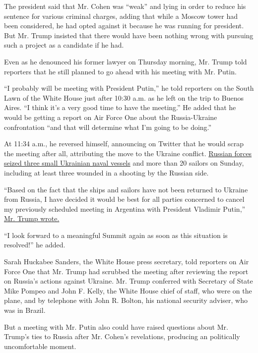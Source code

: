 The president said that Mr. Cohen was ``weak'' and lying in order to
reduce his sentence for various criminal charges, adding that while a
Moscow tower had been considered, he had opted against it because he was
running for president. But Mr. Trump insisted that there would have been
nothing wrong with pursuing such a project as a candidate if he had.

Even as he denounced his former lawyer on Thursday morning, Mr. Trump
told reporters that he still planned to go ahead with his meeting with
Mr. Putin.

``I probably will be meeting with President Putin,'' he told reporters
on the South Lawn of the White House just after 10:30 a.m. as he left on
the trip to Buenos Aires. ``I think it's a very good time to have the
meeting.'' He added that he would be getting a report on Air Force One
about the Russia-Ukraine confrontation ``and that will determine what
I'm going to be doing.''

At 11:34 a.m., he reversed himself, announcing on Twitter that he would
scrap the meeting after all, attributing the move to the Ukraine
conflict.
\href{https://www.nytimes.com/2018/11/26/world/europe/russia-ukraine-kerch-strait.html}{Russian
forces seized three small Ukrainian naval vessels} and more than 20
sailors on Sunday, including at least three wounded in a shooting by the
Russian side.

``Based on the fact that the ships and sailors have not been returned to
Ukraine from Russia, I have decided it would be best for all parties
concerned to cancel my previously scheduled meeting in Argentina with
President Vladimir Putin,''
\href{https://twitter.com/realDonaldTrump/status/1068181367857397760}{Mr.
Trump wrote.}

``I look forward to a meaningful Summit again as soon as this situation
is resolved!'' he added.

Sarah Huckabee Sanders, the White House press secretary, told reporters
on Air Force One that Mr. Trump had scrubbed the meeting after reviewing
the report on Russia's actions against Ukraine. Mr. Trump conferred with
Secretary of State Mike Pompeo and John F. Kelly, the White House chief
of staff, who were on the plane, and by telephone with John R. Bolton,
his national security adviser, who was in Brazil.

But a meeting with Mr. Putin also could have raised questions about Mr.
Trump's ties to Russia after Mr. Cohen's revelations, producing an
politically uncomfortable moment.


